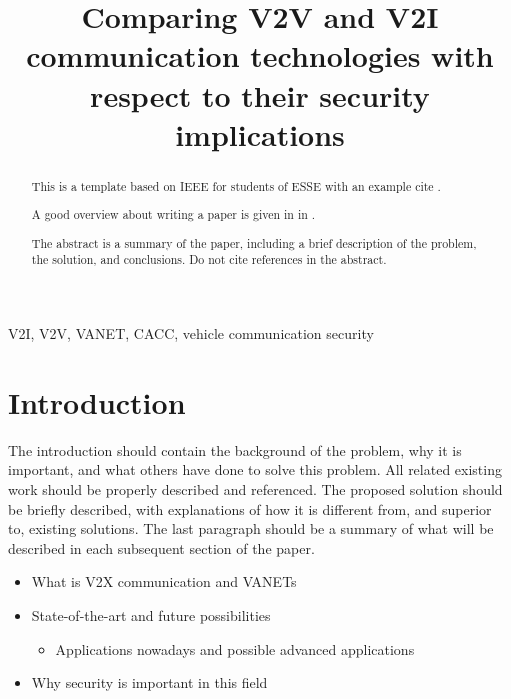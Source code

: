 \documentclass[conference]{IEEEtran}
\title{Comparing V2V and V2I communication technologies with respect to their security implications}
\author{%
	\IEEEauthorblockN{%
		Klaus Krapfenbauer
	}
	\IEEEauthorblockA{\itshape%
		Vienna University of Technology\\
		Industrial Software (INSO)\\
		1040 Vienna, Austria\\
		E-mail: \email{klaus.krapfenbauer@gmail.com}
	}
}
\begin{document}

\maketitle

\begin{abstract}
	This is a template based on IEEE for students of \ac{ESSE} with an example cite \cite{grechenig:2009:softwaretechnik}.

	A good overview about writing a paper is given in \citeauthor{li:1999:hints-on-writing-technical-papers-and-making-presentations} in \cite{li:1999:hints-on-writing-technical-papers-and-making-presentations}.

	The abstract is a summary of the paper, including a brief description of the problem, the solution, and conclusions. Do not cite references in the abstract.
\end{abstract}

\begin{IEEEkeywords}
	V2I, V2V, VANET, CACC, vehicle communication security
\end{IEEEkeywords}

\IEEEpeerreviewmaketitle


\section{Introduction}

The introduction should contain the background of the problem, why it is important, and what others have done to solve this problem. All related existing work should be properly described and referenced. The proposed solution should be briefly described, with explanations of how it is different from, and superior to, existing solutions. The last paragraph should be a summary of what will be described in each subsequent section of the paper.

\begin{itemize}
	\item What is V2X communication and VANETs
	\item State-of-the-art and future possibilities
	\begin{itemize}
		\item Applications nowadays and possible advanced applications
	\end{itemize}
	\item Why security is important in this field
\end{itemize}
\end{document}
